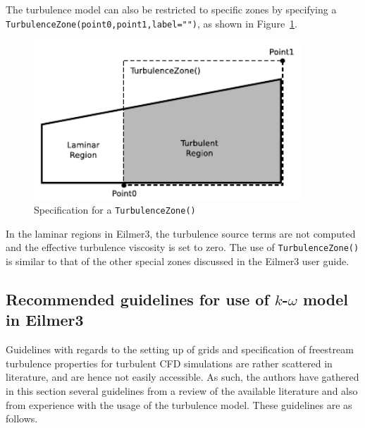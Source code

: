 The turbulence model can also be restricted to specific zones by
specifying a \\ \texttt{TurbulenceZone(point0,point1,label="")}, as shown in
Figure~\ref{turbulence-zone}. 
%
\begin{figure}[h]
 \begin{center}
  \includegraphics[width=10cm]{./chap1-introduction/figs/turbulence-zone.pdf}
 \end{center}
 \caption{Specification for a \texttt{TurbulenceZone()}}
 \label{turbulence-zone}
\end{figure}
%
In the laminar regions in Eilmer3, the turbulence source terms are not 
computed and the effective turbulence viscosity is set to zero. The use of 
\texttt{TurbulenceZone()} is similar to that of the other special zones 
discussed in the Eilmer3 user guide.


\subsection{Recommended guidelines for use of $k$-$\omega$ model in Eilmer3}
\label{section-intro-recommended-guidelines}
%
Guidelines with regards to the setting up of grids and specification of
freestream turbulence properties for turbulent CFD simulations are rather
scattered in literature, and are hence not easily accessible. As such,
the authors have gathered in this section several guidelines from a review
of the available literature and also from experience with the usage of the
turbulence model. These guidelines are as follows.

